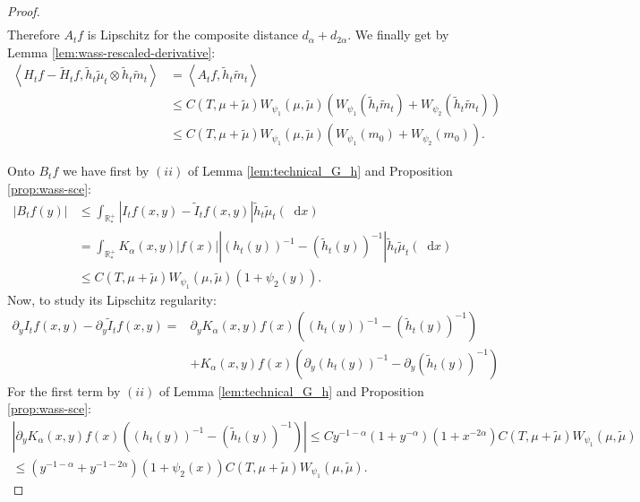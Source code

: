 \documentclass[11pt,a4paper]{article}
\newcommand{\RRP}{\mathbb{R}^+_*}
\newcommand{\brac}[1]{\left\langle#1\right\rangle}
\newcommand{\dd}{\mathop{}\!\mathrm{d}}
\begin{document}
\begin{proof}
\begin{align*}
    \end{align*}
    Therefore $A_tf$ is Lipschitz for the composite distance $d_\alpha + d_{2\alpha}$. We finally get by Lemma \ref{lem:wass-rescaled-derivative}:
    \begin{align*}
        \brac{H_tf - \tilde{H}_tf, \tilde{h}_t\tilde{\mu}_t\otimes \tilde{h}_t\tilde{m}_t} 
        &= \brac{A_tf,\tilde{h}_t\tilde{m}_t} \\
        &\leq C(T,\mu + \tilde{\mu}) W_{\psi_1}(\mu,\tilde{\mu}) \left(W_{\psi_1}(\tilde{h}_t\tilde{m}_t) + W_{\psi_2}(\tilde{h}_t\tilde{m}_t) \right)\\
        &\leq C(T,\mu + \tilde{\mu}) W_{\psi_1}(\mu,\tilde{\mu})\left(W_{\psi_1}(m_0) + W_{\psi_2}(m_0) \right).
    \end{align*}

    Onto $B_tf$ we have first by $(ii)$ of Lemma \ref{lem:technical_G_h} and Proposition \ref{prop:wass-sce}:
    \begin{align*}
        \left|B_tf(y) \right| 
        &\leq \int_{\RRP} \left| I_tf(x,y) - \tilde{I}_tf(x,y)\right| \tilde{h}_t \tilde{\mu}_t(\dd x) \\
        &= \int_{\RRP} K_\alpha(x,y) |f(x)| \left| \left(h_t(y) \right)^{-1} - \left(\tilde{h}_t(y) \right)^{-1} \right| \tilde{h}_t \tilde{\mu}_t(\dd x) \\
        &\leq C(T,\mu + \tilde{\mu}) W_{\psi_1}(\mu,\tilde{\mu})   (1 + \psi_2(y)).
    \end{align*}
    Now, to study its Lipschitz regularity:
    \begin{align*}
        \partial_y I_tf(x,y) - \partial_y \tilde{I}_tf(x,y) 
        =& \partial_y K_\alpha(x,y) f(x)\left( \left(h_t(y) \right)^{-1} - \left(\tilde{h}_t(y) \right)^{-1} \right) \\
        &+  K_\alpha(x,y) f(x)\left( \partial_y \left(h_t(y) \right)^{-1} - \partial_y \left(\tilde{h}_t(y) \right)^{-1} \right) 
    \end{align*}
    For the first term by $(ii)$ of Lemma \ref{lem:technical_G_h} and Proposition \ref{prop:wass-sce}:
    \begin{align*}
        \left| \partial_y K_\alpha(x,y) f(x)\left( \left(h_t(y) \right)^{-1} - \left(\tilde{h}_t(y) \right)^{-1} \right) \right| 
        \leq C y^{-1-\alpha} (1 + y^{-\alpha}) (1 + x^{-2\alpha}) C(T,\mu + \tilde{\mu}) W_{\psi_1}(\mu,\tilde{\mu}) \\
        \leq (y^{-1-\alpha} + y^{-1-2\alpha})(1 + \psi_2(x)) C(T,\mu + \tilde{\mu})  W_{\psi_1}(\mu,\tilde{\mu}).

\end{align*}
\end{proof}
\end{document}
